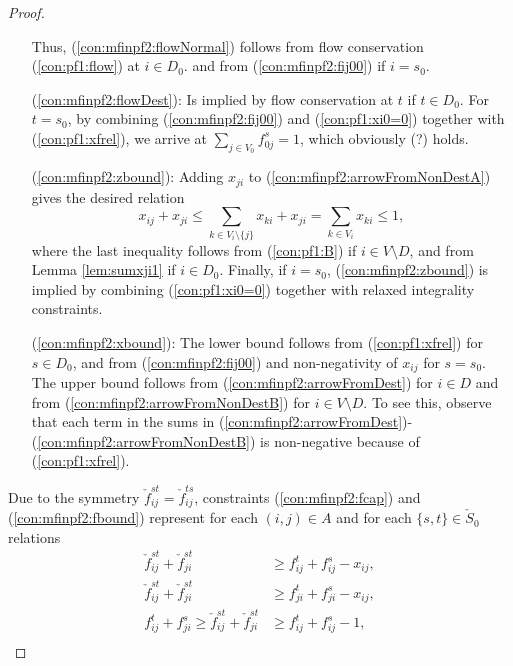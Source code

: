 \begin{proof}
\begin{itemize}[leftmargin=1cm]
	Thus, (\ref{con:mfinpf2:flowNormal}) follows from flow conservation (\ref{con:pf1:flow}) at $i\in D_0$. and from (\ref{con:mfinpf2:fij00}) if $i=s_0$.
\item[(\ref{con:mfinpf2:flowDest}):] Is implied by flow conservation at $t$  if $t\in D_0$. For $t=s_0$, by combining (\ref{con:mfinpf2:fij00}) and (\ref{con:pf1:xi0=0}) together with (\ref{con:pf1:xfrel}), we arrive at $\sum_{j\in V_0}f^s_{0j}=1$, which obviously (?) holds. 
\item[ (\ref{con:mfinpf2:zbound}):]
 	Adding $x_{ji}$ to (\ref{con:mfinpf2:arrowFromNonDestA}) gives the desired relation
	\[
	x_{ij}+x_{ji}\leq\sum_{k\in V_i\setminus\{j\}}x_{ki} +x_{ji}=\sum_{k\in V_i}x_{ki}\leq 1,
	\]
	where the last inequality follows from (\ref{con:pf1:B}) if $i\in V\setminus D$, and from Lemma \ref{lem:sumxji1} if $i\in D_0$. 
	Finally, if $i=s_0$, (\ref{con:mfinpf2:zbound}) is implied by combining (\ref{con:pf1:xi0=0}) together with relaxed integrality constraints.
\item[ (\ref{con:mfinpf2:xbound}):] The lower bound follows from (\ref{con:pf1:xfrel}) for $s\in D_0$, and from (\ref{con:mfinpf2:fij00}) and non-negativity of $x_{ij}$ for $s=s_0$.
	The upper bound follows from (\ref{con:mfinpf2:arrowFromDest}) for $i\in D$ and from (\ref{con:mfinpf2:arrowFromNonDestB}) for $i\in V\setminus D$.
	To see this, observe that each term in the sums in (\ref{con:mfinpf2:arrowFromDest})-(\ref{con:mfinpf2:arrowFromNonDestB}) is non-negative because of (\ref{con:pf1:xfrel}).
\end{itemize}
Due to the symmetry $\check{f}^{st}_{ij} = \check{f}^{ts}_{ij}$, constraints (\ref{con:mfinpf2:fcap}) and (\ref{con:mfinpf2:fbound}) represent for each $(i,j)\in A$ and for each $\{s,t\}\in \check{S}_0$ relations
\begin{subequations}
\begin{align}
\label{fcapa}\check{f}^{st}_{ij} + \check{f}^{st}_{ji} &\geq f^t_{ij} + f^s_{ij}-x_{ij}, \\
\label{fcapb}\check{f}^{st}_{ij} + \check{f}^{st}_{ji} &\geq f^t_{ji} + f^s_{ji}-x_{ij}, \\
\label{fbounda}f^t_{ij}+ f^s_{ji}\geq\check{f}^{st}_{ij} + \check{f}^{st}_{ji} &\geq f^t_{ij} + f^s_{ij}-1, \\

\end{align}
\end{subequations}
\end{proof}
